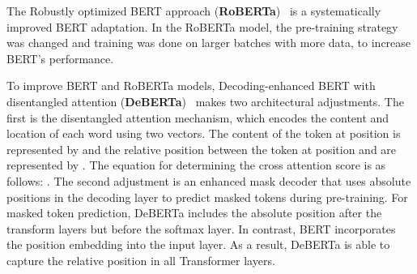 \documentclass[runningheads]{llncs}
\begin{document}
The Robustly optimized BERT approach (\textbf{RoBERTa})~\cite{liu2019roberta} is a systematically improved \ac{BERT} adaptation.
In the \ac{RoBERTa} model, the pre-training strategy was changed and training was done on larger batches with more data, to increase \ac{BERT}'s performance. 


To improve BERT and RoBERTa models, Decoding-enhanced BERT with disentangled attention (\textbf{DeBERTa})~\cite{DBLP:conf/iclr/HeLGC21} makes two architectural adjustments.
The first is the disentangled attention mechanism, which encodes the content and location of each word using two vectors. The content of the token at position  is represented by   and the relative position  between the token at position  and  are represented by . The equation for determining the cross attention score is as follows:
 .
The second adjustment is an enhanced mask decoder that uses absolute positions in the decoding layer to predict masked tokens during pre-training. 
For masked token prediction, DeBERTa includes the absolute position after the transform layers but before the softmax layer.
In contrast, BERT incorporates the position embedding into the input layer.
As a result, DeBERTa is able to capture the relative position in all Transformer layers.
\end{document}
